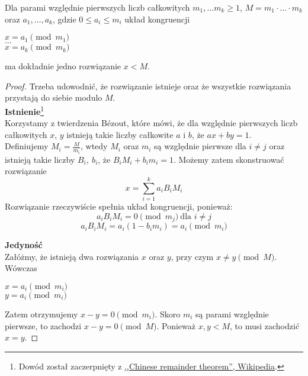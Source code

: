 \begin{theorem}
    Dla parami względnie pierwszych liczb całkowitych \( m_1, \dots m_k \geq 1 \), \( M = m_1 \cdot \ldots \cdot m_k \) oraz \( a_1, \ldots, a_k \), gdzie \( 0 \leq a_i \leq m_i \) układ kongruencji
    \begin{center}
        \( x = a_1 \pmod{m_1} \) \\
        \( \dots \) \\
        \( x = a_k \pmod{m_k} \)
    \end{center}
    ma dokładnie jedno rozwiązanie \( x < M \).
\end{theorem}
\begin{proof}
    Trzeba udowodnić, że rozwiązanie istnieje oraz że wszystkie rozwiązania przystają do siebie modulo \( M \). \\
    \textbf{Istnienie}\footnote{Dowód został zaczerpnięty z \href{https://en.wikipedia.org/wiki/Chinese_remainder_theorem#Proof}{,,Chinese remainder theorem'', Wikipedia}.} \\
    Korzystamy z twierdzenia B\'ezout, które mówi, że dla względnie pierwszych liczb całkowitych \( x \), \( y \) istnieją takie liczby całkowite \( a \) i \( b \), że \( ax + by = 1 \). \\
    Definiujemy \( M_i = \frac{M}{m_i} \), wtedy \( M_i \) oraz \( m_i \) są względnie pierwsze dla \( i \neq j \) oraz istnieją takie liczby \( B_i, \ b_i \), że \( B_iM_i + b_im_i = 1 \).
    Możemy zatem skonstruować rozwiązanie
    \[
        x = \sum_{i=1}^{k} a_iB_iM_i
    \]
    Rozwiązanie rzeczywiście spełnia układ kongruencji, ponieważ:
    \[
        a_iB_iM_i = 0 \pmod{m_j} \ \text{dla } i \neq j
    \]
    \[
        a_iB_iM_i = a_i(1 - b_im_i) = a_i \pmod{m_i}
    \]

    \textbf{Jedyność} \\
    Załóżmy, że istnieją dwa rozwiązania \( x \) oraz \( y \), przy czym \( x \neq y \pmod{M} \). Wówczas
    \begin{center}
        \( x = a_i \pmod{m_i} \) \\
        \( y = a_i \pmod{m_i} \)
    \end{center}
    Zatem otrzymujemy \( x-y = 0 \pmod{m_i} \). Skoro \( m_i \) są parami względnie pierwsze, to zachodzi \(  x-y = 0 \pmod{M} \).
    Ponieważ \( x, y < M \), to musi zachodzić \( x = y \).
\end{proof}